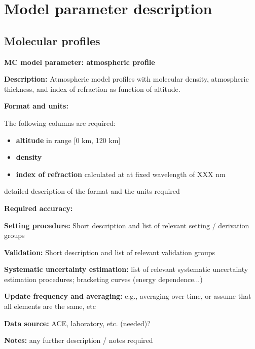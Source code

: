 \section{Model parameter description}

\subsection{Molecular profiles}

\textbf{MC model parameter: atmospheric profile}

\textbf{Description: }
Atmospheric model profiles with molecular density, atmospheric thickness, and index of refraction as function of altitude.

\textbf{Format and units:}

The following columns are required:
\begin{itemize}
\item \textbf{altitude} in range [0 km, 120 km]

\item \textbf{density}

\item \textbf{index of refraction} calculated at at fixed wavelength of XXX nm

\end{itemize}

detailed description of the format and the units required

\textbf{Required accuracy:}

\textbf{Setting procedure:}
Short description and list of relevant setting / derivation groups

\textbf{Validation:}
Short description and list of relevant validation groups 

\textbf{Systematic uncertainty estimation:}
list of relevant systematic uncertainty estimation procedures; bracketing curves (energy dependence...) 

\textbf{Update frequency and averaging:}
e.g., averaging over time, or assume that all elements are the same, etc

\textbf{Data source:}
ACE, laboratory, etc. (needed)?

\textbf{Notes:}
 any further description / notes required
